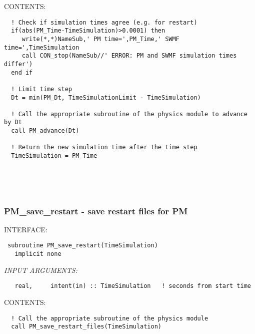 \bigskip
{\sf CONTENTS:}
\begin{verbatim}
  ! Check if simulation times agree (e.g. for restart)
  if(abs(PM_Time-TimeSimulation)>0.0001) then
     write(*,*)NameSub,' PM time=',PM_Time,' SWMF time=',TimeSimulation
     call CON_stop(NameSub//' ERROR: PM and SWMF simulation times differ')
  end if

  ! Limit time step
  Dt = min(PM_Dt, TimeSimulationLimit - TimeSimulation)

  ! Call the appropriate subroutine of the physics module to advance by Dt
  call PM_advance(Dt)

  ! Return the new simulation time after the time step
  TimeSimulation = PM_Time

 
\end{verbatim}
 
 
\mbox{}\hrulefill\ 
 
\newpage


\subsubsection{ PM\_save\_restart - save restart files for PM }


\bigskip
{\sf INTERFACE:}
\begin{verbatim} subroutine PM_save_restart(TimeSimulation)
   implicit none\end{verbatim}
{\em INPUT ARGUMENTS:}
\begin{verbatim}   real,     intent(in) :: TimeSimulation   ! seconds from start time\end{verbatim}



\bigskip
{\sf CONTENTS:}
\begin{verbatim}
  ! Call the appropriate subroutine of the physics module
  call PM_save_restart_files(TimeSimulation)
 
\end{verbatim}
 
 
\mbox{}\hrulefill\ 
 
\newpage


